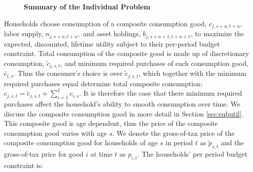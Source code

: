  \begin{figure}[htb]\centering \captionsetup{width=4.0in}
\caption{\label{fig:hh_tree}\textbf{Summary of the Individual Problem}}
\end{figure}


    Households choose consumption of a composite consumption good, $c_{j,s+u,t+u}$, labor supply, $n_{j,s+u,t+u},$ and asset holdings, $b_{j,s+u+1,t+u+1}$, to maximize the expected, discounted, lifetime utility subject to their per-period budget constraint.  Total consumption of the composite good is made up of discretionary consumption, $\tilde{c}_{j,s,t}$, and minimum required purchases of each consumption good, $\bar{c}_{i,s}$.  Thus the consumer's choice is over $\tilde{c}_{j,s,t}$, which together with the minimum required purchases equal determine total composite consumption: $c_{j,s,t}=\tilde{c}_{j,s,t}+\sum_{i=1}^{I}c_{i,s}$.  It is therefore the case that there minimum required purchases affect the household's ability to smooth consumption over time.  We discuss the composite consumption good in more detail in Section \ref{sec:subutil}.  This composite good is age dependent, thus the price of the composite consumption good varies with age $s$.  We denote the gross-of-tax price of the composite consumption good for households of age $s$ in period $t$ as $\tilde{p}_{s,t}$ and the gross-of-tax price for good $i$ at time $t$ as $p_{i,t}$. The households' per period budget constraint is:
    

